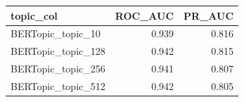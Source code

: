 \begin{tabular}{lrr}
\toprule
topic\_col & ROC\_AUC & PR\_AUC \\
\midrule
BERTopic\_topic\_10 & 0.939 & 0.816 \\
BERTopic\_topic\_128 & 0.942 & 0.815 \\
BERTopic\_topic\_256 & 0.941 & 0.807 \\
BERTopic\_topic\_512 & 0.942 & 0.805 \\
\bottomrule
\end{tabular}
